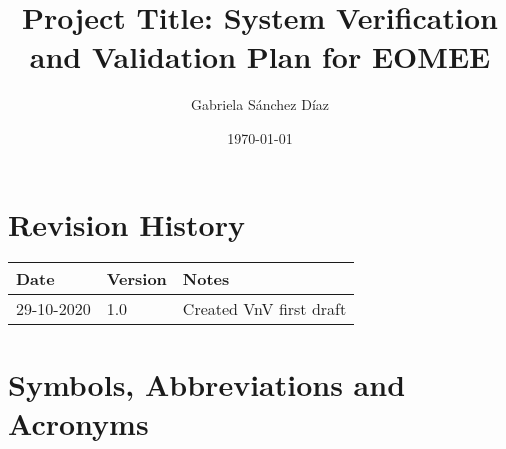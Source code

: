 \documentclass[12pt, titlepage]{article}
\begin{document}
\title{Project Title: System Verification and Validation Plan for EOMEE} 
\author{Gabriela S\'anchez D\'iaz}
\date{\today}
	
\maketitle


\section{Revision History}

\begin{tabularx}{\textwidth}{p{3cm}p{2cm}X}
\toprule {\bf Date} & {\bf Version} & {\bf Notes}\\
\midrule
29-10-2020 & 1.0 & Created VnV first draft \\
\bottomrule
\end{tabularx}

\newpage

\tableofcontents

\listoftables

\listoffigures

\newpage

\section{Symbols, Abbreviations and Acronyms}
\end{document}
